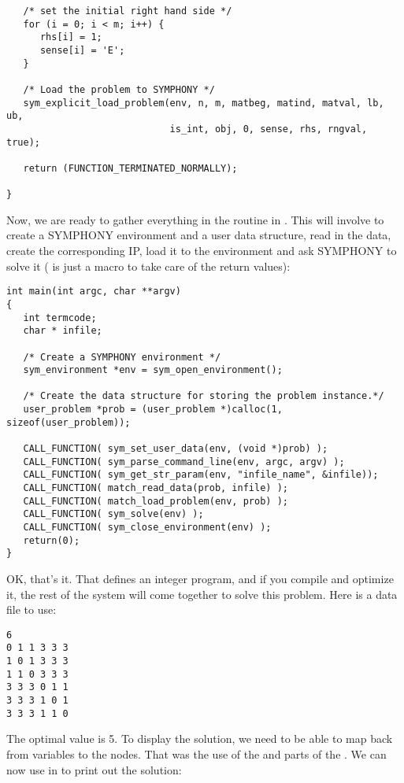{{\begin{verbatim}
   /* set the initial right hand side */
   for (i = 0; i < m; i++) {
      rhs[i] = 1;
      sense[i] = 'E';
   }
   
   /* Load the problem to SYMPHONY */   
   sym_explicit_load_problem(env, n, m, matbeg, matind, matval, lb, ub, 
                             is_int, obj, 0, sense, rhs, rngval, true);
			     
   return (FUNCTION_TERMINATED_NORMALLY);

}
\end{verbatim}
}

Now, we are ready to gather everything in the  routine in 
. This will involve to create a SYMPHONY environment and 
a user data structure, read in the data, create the corresponding IP, 
load it to the environment and ask SYMPHONY to solve it 
( is just a macro to take care of the return values):  

{\color{Brown}
\begin{verbatim}
int main(int argc, char **argv)
{
   int termcode;
   char * infile;

   /* Create a SYMPHONY environment */
   sym_environment *env = sym_open_environment();

   /* Create the data structure for storing the problem instance.*/
   user_problem *prob = (user_problem *)calloc(1, sizeof(user_problem));
   
   CALL_FUNCTION( sym_set_user_data(env, (void *)prob) );
   CALL_FUNCTION( sym_parse_command_line(env, argc, argv) );
   CALL_FUNCTION( sym_get_str_param(env, "infile_name", &infile));
   CALL_FUNCTION( match_read_data(prob, infile) );
   CALL_FUNCTION( match_load_problem(env, prob) );
   CALL_FUNCTION( sym_solve(env) );
   CALL_FUNCTION( sym_close_environment(env) );
   return(0);
}
\end{verbatim}
}

OK, that's it. That defines an integer program, and if you compile and
optimize it, the rest of the system will come together to solve this problem.
Here is a data file to use:
{\color{Brown}
\begin{verbatim}
6
0 1 1 3 3 3
1 0 1 3 3 3
1 1 0 3 3 3
3 3 3 0 1 1
3 3 3 1 0 1
3 3 3 1 1 0
\end{verbatim}
}

The optimal value is 5. To display the solution, we need to be able to map
back from variables to the nodes. That was the use of the  and
 parts of the . We can now use
 in  to print 
out the solution:

}
